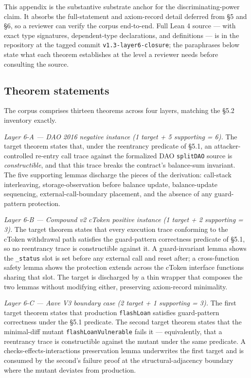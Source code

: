 This appendix is the substantive substrate anchor for the
discriminating-power claim. It absorbs the full-statement and
axiom-record detail deferred from §5 and §6, so a reviewer can verify
the corpus end-to-end. Full Lean 4 source --- with exact type
signatures, dependent-type declarations, and definitions --- is in the
repository at the tagged commit \texttt{v1.3-layer6-closure}; the
paraphrases below state what each theorem establishes at the level a
reviewer needs before consulting the source.

\subsection{Theorem statements}\label{theorem-statements}

The corpus comprises thirteen theorems across four layers, matching the
§5.2 inventory exactly.

\emph{Layer 6-A --- DAO 2016 negative instance (1 target + 5 supporting
= 6).} The target theorem states that, under the reentrancy predicate of
§5.1, an attacker-controlled re-entry call trace against the formalized
DAO \texttt{splitDAO} source is \emph{constructible}, and that this
trace breaks the contract's balance-sum invariant. The five supporting
lemmas discharge the pieces of the derivation: call-stack interleaving,
storage-observation before balance update, balance-update sequencing,
external-call-boundary placement, and the absence of any guard-pattern
protection.

\emph{Layer 6-B --- Compound v2 cToken positive instance (1 target + 2
supporting = 3).} The target theorem states that every execution trace
conforming to the cToken withdrawal path satisfies the guard-pattern
correctness predicate of §5.1, so no reentrancy trace is constructible
against it. A guard-invariant lemma shows the \texttt{\_status} slot is
set before any external call and reset after; a cross-function safety
lemma shows the protection extends across the cToken interface functions
sharing that slot. The target is discharged by a thin wrapper that
composes the two lemmas without modifying either, preserving
axiom-record minimality.

\emph{Layer 6-C --- Aave V3 boundary case (2 target + 1 supporting =
3).} The first target theorem states that production \texttt{flashLoan}
satisfies guard-pattern correctness under the §5.1 predicate. The second
target theorem states that the minimal-diff mutant
\texttt{flashLoanVulnerable} fails it --- equivalently, that a
reentrancy trace is constructible against the mutant under the same
predicate. A checks-effects-interactions preservation lemma underwrites
the first target and is consumed by the second's failure proof at the
structural-adjacency boundary where the mutant deviates from production.

